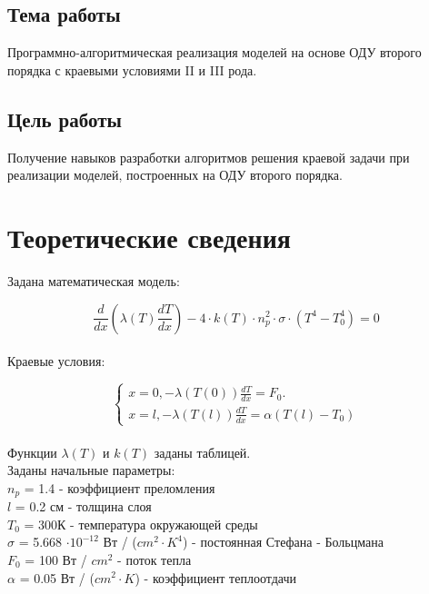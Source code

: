 \section*{Тема работы}

Программно-алгоритмическая реализация моделей на основе ОДУ второго порядка с краевыми условиями II и III рода.

\section*{Цель работы}

Получение навыков разработки алгоритмов решения краевой задачи при реализации моделей, построенных на ОДУ второго порядка.

\chapter{Теоретические сведения}

Задана математическая модель:

\begin{equation*}
	\frac{d}{dx}(\lambda(T)\frac{dT}{dx}) - 4 \cdot k(T) \cdot n_{p}^2 \cdot \sigma \cdot (T^4 - T_{0}^4) = 0
\end{equation*}\\

Краевые условия:

\begin{equation*}
	\begin{cases} x = 0, -\lambda(T(0))\frac{dT}{dx} = F_{0}.
	\\ x = l, -\lambda(T(l))\frac{dT}{dx} = \alpha(T(l) - T_{0})
	\end{cases}
\end{equation*}\\

Функции $\lambda(T)$ и $k(T)$ заданы таблицей.\\

Заданы начальные параметры:\\
\indent $n_p$ = 1.4 - коэффициент преломления\\
\indent $l$ = 0.2 см - толщина слоя\\
\indent $T_{0}$ = 300К - температура окружающей среды\\
\indent $\sigma$ = 5.668 $\cdot 10^{-12}$ Вт / ($cm^2 \cdot K^4$) - постоянная Стефана - Больцмана\\
\indent $F_{0}$ = 100 Вт / $cm^2$ - поток тепла\\
\indent $\alpha$ = 0.05 Вт / ($cm^2 \cdot K$) - коэффициент теплоотдачи\\

